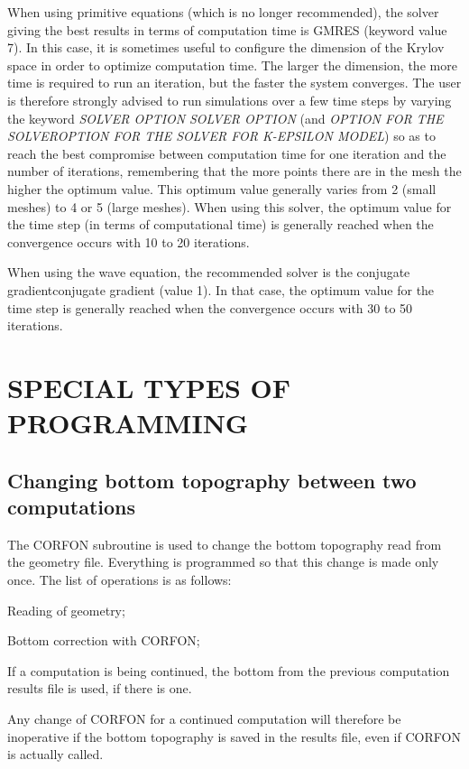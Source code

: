  When using primitive equations (which is no longer recommended), the solver giving the best results in terms of computation time is GMRES (keyword value 7). In this case, it is sometimes useful to configure the dimension of the Krylov space in order to optimize computation time. The larger the dimension, the more time is required to run an iteration, but the faster the system converges. The user is therefore strongly advised to run simulations over a few time steps by varying the keyword \textit{SOLVER OPTION} \textit{SOLVER OPTION} (and \textit{OPTION FOR THE SOLVEROPTION FOR THE SOLVER FOR K-EPSILON MODEL}) so as to reach the best compromise between computation time for one iteration and the number of iterations, remembering that the more points there are in the mesh the higher the optimum value. This optimum value generally varies from 2 (small meshes) to 4 or 5 (large meshes). When using this solver, the optimum value for the time step (in terms of computational time) is generally reached when the convergence occurs with 10 to 20 iterations.

 When using the wave equation, the recommended solver is the conjugate gradientconjugate gradient (value 1). In that case, the optimum value for the time step is generally reached when the convergence occurs with 30 to 50 iterations.


\section{ SPECIAL TYPES OF PROGRAMMING}


\subsection{ Changing bottom topography between two computations}

 The CORFON subroutine is used to change the bottom topography read from the geometry file. Everything is programmed so that this change is made only once. The list of operations is as follows:

 Reading of geometry;

 Bottom correction with CORFON;

 If a computation is being continued, the bottom from the previous computation results file is used, if there is one.

 Any change of CORFON for a continued computation will therefore be inoperative if the bottom topography is saved in the results file, even if CORFON is actually called.

